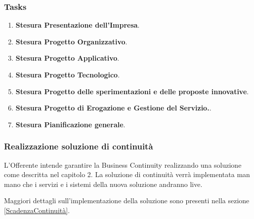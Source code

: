 					\subsubsection*{Tasks}
                    \begin{enumerate}
                    	\item \textbf{Stesura Presentazione dell'Impresa}.
                        \item \textbf{Stesura Progetto Organizzativo}.
                        \item \textbf{Stesura Progetto Applicativo}.
                        \item \textbf{Stesura Progetto Tecnologico}.
                        \item \textbf{Stesura Progetto delle sperimentazioni e delle proposte innovative}.
                        \item \textbf{Stesura Progetto di Erogazione e Gestione del Servizio.}.
                        \item \textbf{Stesura Pianificazione generale}.
                    \end{enumerate}
                    
			\subsubsection{Realizzazione soluzione di continuità}
            	L'Offerente intende garantire la Business Continuity realizzando una soluzione come descritta nel capitolo 2. La soluzione di continuità verrà implementata man mano che i servizi e i sistemi della nuova soluzione andranno live.
                
                
                Maggiori dettagli sull'implementazione della soluzione sono presenti nella sezione \ref{ScadenzaContinuità}.
                
